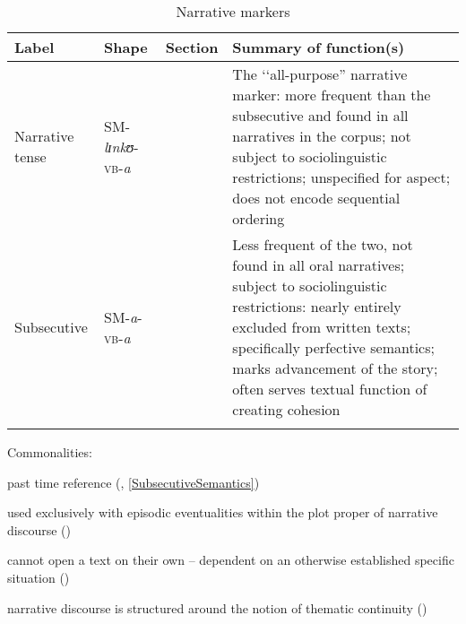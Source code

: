 \begin{sidewaystable}
	\begin{tabularx}{\textwidth}{lllX}
	\lsptoprule
	\footnotesize{Label} & \footnotesize{Shape} & \footnotesize{Section} & \footnotesize{Summary of function(s)}\\
	\midrule
	Narrative tense & SM-\textit{lɪnkʊ}-\textsc{vb}-\textit{a} & \sectref{NarrativeTense} & The \lq\lq all-purpose'' narrative marker: more frequent than the subsecutive and found in all narratives in the corpus; not subject to sociolinguistic restrictions; unspecified for aspect; does not encode sequential ordering\\
	Subsecutive & SM-\textit{a}-\textsc{vb}-\textit{a} & \sectref{Subsecutive} & Less frequent of the two, not found in all oral narratives; subject to	sociolinguistic	restrictions: nearly entirely excluded from written texts; specifically perfective semantics; marks advancement of the story; often serves textual function of creating cohesion\\
	\lspbottomrule
	\end{tabularx}
	\caption{Narrative markers}\label{tabAppendixNarrativeMarkers}
\begin{flushleft}
	Commonalities:
	\begin{compactitem}
		\item past time reference (, \ref{SubsecutiveSemantics})
		\item used exclusively with episodic eventualities within the plot proper of narrative discourse ()
		\item cannot open a text on their own -- dependent on an otherwise established specific situation ()
		\item narrative discourse is structured around the notion of thematic continuity ()
	\end{compactitem}

\end{flushleft}
\end{sidewaystable}


